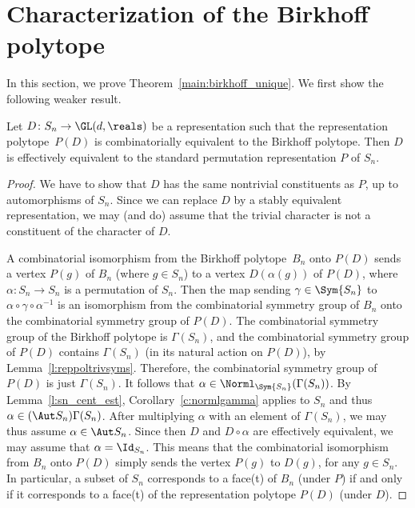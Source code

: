 \section{Characterization of the Birkhoff polytope}
In this section, we prove Theorem~\ref{main:birkhoff_unique}.
We first show the following weaker result.

\begin{lemma}\label{l:snbirk_unique}
  Let $D\colon S_n \to \GL(d,\reals)$ be a representation 
  such that the representation polytope~$P(D)$ is combinatorially
  equivalent to the Birkhoff polytope.
  Then $D$ is effectively equivalent to 
  the standard permutation representation $P$ of $S_n$.  
\end{lemma}

\begin{proof}  
  We have to show that $D$ has the same nontrivial constituents
  as $P$, up to automorphisms of $S_n$.
  Since we can replace $D$ by a stably equivalent representation,
  we may (and do) assume that
  the trivial character is not a constituent of the character of $D$.
  
  A combinatorial isomorphism from the Birkhoff polytope~$B_n$
  onto $P(D)$ sends a vertex $P(g)$ of $B_n$ (where $g\in S_n$)
  to a vertex $D(\alpha(g))$ of $P(D)$,
  where $\alpha\colon S_n \to S_n$ is a permutation of $S_n$.
  Then the map sending
  $\gamma\in \Sym{S_n}$ to 
  $\alpha \circ \gamma\circ \alpha^{-1}$
  is an isomorphism from the combinatorial symmetry group of 
  $B_n$ onto the combinatorial symmetry group of $P(D)$.
  The combinatorial symmetry group of the Birkhoff
  polytope is $\Gamma(S_n)$,
  and the combinatorial symmetry group of $P(D)$ contains 
  $\Gamma(S_n)$ (in its natural action on $P(D)$), 
  by Lemma~\ref{l:reppoltrivsyms}.
  Therefore, the combinatorial symmetry group of $P(D)$
  is just $\Gamma(S_n)$.
  It follows that $\alpha \in \Norml_{\Sym{S_n}}(\Gamma(S_n))$.
  By Lemma~\ref{l:sn_cent_est}, Corollary~\ref{c:normlgamma}
  applies to $S_n$ and thus 
  $\alpha\in (\Aut S_n)\Gamma(S_n)$.
  After multiplying $\alpha$ with an element of
  $\Gamma(S_n)$, we may thus assume
  $\alpha \in \Aut S_n$.
  Since then $D$ and $D\circ\alpha$ are effectively equivalent,
  we may assume that $\alpha = \Id_{S_n}$.
  This means that the combinatorial isomorphism from $B_n$ onto $P(D)$
  simply sends the vertex $P(g)$ to $D(g)$, for any $g\in S_n$.
  In particular, a subset of $S_n$ corresponds to a face(t)
  of $B_n$ (under $P$) 
  if and only if it corresponds to a face(t)
  of the representation polytope $P(D)$ (under $D$).
  

\end{proof}

